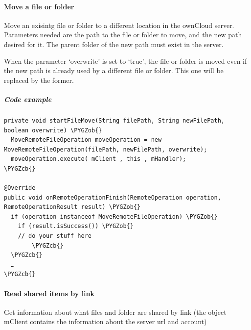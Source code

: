\documentclass[letterpaper,10pt,english]{sphinxmanual}
\def\PYGZob{\char`\{}
\def\PYGZcb{\char`\}}
\begin{document}
\paragraph{Move a file or folder}
\label{android_library/examples:move-a-file-or-folder}
Move an exisintg file or folder to a different location in the ownCloud server. Parameters needed are the path
to the file or folder to move, and the new path desired for it. The parent folder of the new path must exist in
the server.

When the parameter `overwrite' is set to `true', the file or folder is moved even if the new path is already
used by a different file or folder. This one will be replaced by the former.


\subparagraph{Code example}
\label{android_library/examples:id8}
\begin{Verbatim}[commandchars=\\\{\}]
private void startFileMove(String filePath, String newFilePath, boolean overwrite) \PYGZob{}
  MoveRemoteFileOperation moveOperation = new MoveRemoteFileOperation(filePath, newFilePath, overwrite);
  moveOperation.execute( mClient , this , mHandler);
\PYGZcb{}

@Override
public void onRemoteOperationFinish(RemoteOperation operation, RemoteOperationResult result) \PYGZob{}
  if (operation instanceof MoveRemoteFileOperation) \PYGZob{}
    if (result.isSuccess()) \PYGZob{}
    // do your stuff here
        \PYGZcb{}
  \PYGZcb{}
  …
\PYGZcb{}
\end{Verbatim}


\paragraph{Read shared items by link}
\label{android_library/examples:read-shared-items-by-link}
Get information about what files and folder are shared by link (the object
mClient contains the information about the server url and account)
\end{document}
